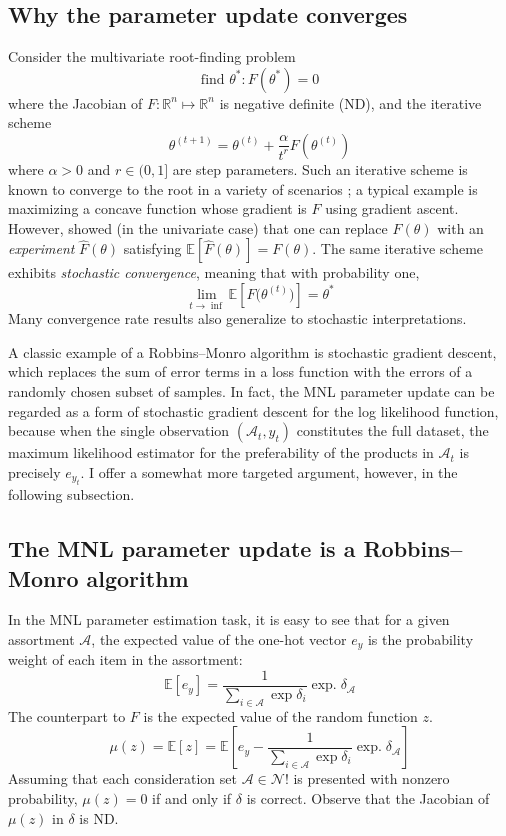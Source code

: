 \documentclass[preprint,12pt,authoryear]{elsarticle}
\DeclareMathOperator*{\expd}{exp.}
\begin{document}
\subsection{Why the parameter update converges}
Consider the multivariate root-finding problem \[\text{find } \theta^*: F(\theta^*) = 0\]
where the Jacobian of $F: \mathbb{R}^n \mapsto \mathbb{R}^n$ is negative definite (ND), and the iterative scheme \[\theta^{(t+1)} = \theta^{(t)} + \frac{\alpha}{t^r} F\left(\theta^{(t)} \right)\]
where $\alpha >0$ and $r \in (0, 1]$ are step parameters. Such an iterative scheme is known to converge to the root in a variety of scenarios %
; a typical example is maximizing a concave function whose gradient is $F$ using gradient ascent. However, \cite{robbinsmonro1951} showed (in the univariate case) that one can replace $F(\theta)$ with an \emph{experiment} $\hat F(\theta)$ satisfying $\mathbb{E}\left[\hat F(\theta)\right] = F(\theta)$. The same iterative scheme exhibits \emph{stochastic convergence}, meaning that with probability one,
\[\lim_{t\to \inf} \mathbb{E}\left[F\bigl(\theta^{(t)}\bigr)\right] = \theta^*\]
Many convergence rate results also generalize to stochastic interpretations.

A classic example of a Robbins--Monro algorithm is stochastic gradient descent, which replaces the sum of error terms in a loss function with the errors of a randomly chosen subset of samples. In fact, the MNL parameter update can be regarded as a form of stochastic gradient descent for the log likelihood function, because when the single observation $(\mathcal{A}_t, y_t)$ constitutes the full dataset, the maximum likelihood estimator for the preferability of the products in $\mathcal{A}_t$ is precisely $e_{y_t}$. I offer a somewhat more targeted argument, however, in the following subsection.

\subsection{The MNL parameter update is a Robbins--Monro algorithm}
In the MNL parameter estimation task, it is easy to see that for a given assortment $\mathcal{A}$, the expected value of the one-hot vector $e_y$ is the probability weight of each item in the assortment:
\begin{equation}\mathbb{E}[e_{y}]  = \frac{1}{\sum_{i\in \mathcal{A}} \exp \delta_i} \expd \delta_{\mathcal{A}}\end{equation}
The counterpart to $F$ is the expected value of the random function $z$.
\begin{equation}\mu(z) = \mathbb{E}[z] = \mathbb{E}\left[e_{y} -  \frac{1}{\sum_{i\in \mathcal{A}} \exp \delta_i} \expd \delta_{\mathcal{A}} \right]\end{equation}
Assuming that each consideration set $\mathcal{A} \in \mathcal{N}!$ is presented with nonzero probability, $\mu(z) = 0$ if and only if $\delta$ is correct. Observe that the Jacobian of $\mu(z)$ in $\delta$ is ND. 
\end{document}
